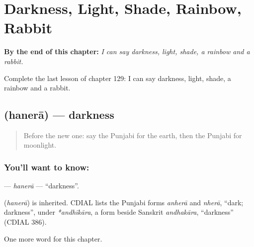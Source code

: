 
\chapter{Darkness, Light, Shade, Rainbow, Rabbit}
\label{ch:pa-darkness-light-shade-rainbow-rabbit}

\begin{chapteropening}
\textbf{By the end of this chapter:} \emph{I can say darkness, light, shade, a rainbow and a rabbit.}

Complete the last lesson of chapter 129: I can say darkness, light, shade, a rainbow and a rabbit.
\end{chapteropening}

\section[\texorpdfstring{\pa{ਹਨੇਰਾ} (hanerā)}{ਹਨੇਰਾ (hanerā)}]{ (hanerā) — darkness}

\label{lesson:PA-C129-hanera}



\begin{quote}
Before the new one: say the Punjabi for the earth, then the Punjabi for moonlight.
\end{quote}

\subsection*{You'll want to know: }
\textbf{} — \emph{hanerā} — \textquotedblleft{}darkness\textquotedblright{}.

\begin{cousinweb}
\textbf{} (\emph{hanerā}) is inherited. CDIAL lists the Punjabi forms \emph{anherā} and \emph{nherā}, \textquotedblleft{}dark; darkness\textquotedblright{}, under \emph{*andhīkāra}, a form beside Sanskrit \emph{andhakāra}, \textquotedblleft{}darkness\textquotedblright{} (CDIAL 386).
\end{cousinweb}

\begin{grammarlens}[title={What you've built}]
One more word for this chapter.
\end{grammarlens}

